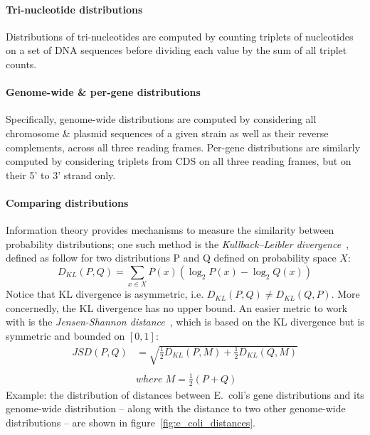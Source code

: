 \documentclass[12pt]{article}
\begin{document}
\paragraph{Tri-nucleotide distributions}
Distributions of tri-nucleotides are computed by counting triplets of nucleotides on a set of DNA sequences before dividing each value by the sum of all triplet counts.

\paragraph{Genome-wide \& per-gene distributions}
Specifically, genome-wide distributions are computed by considering all chromosome \& plasmid sequences of a given strain as well as their reverse complements, across all three reading frames. Per-gene distributions are similarly computed by considering triplets from CDS on all three reading frames, but on their 5' to 3' strand only.

\paragraph{Comparing distributions}
Information theory provides mechanisms to measure the similarity between probability distributions; one such method is the \textit{Kullback–Leibler divergence}~\cite{kullback1951information}, defined as follow for two distributions P and Q defined on probability space $X$:
%
\begin{equation}
D_{KL}(P, Q) = \sum\limits_{x \in X} P(x) (\log_2 P(x) - \log_2 Q(x))
\end{equation}
%
Notice that KL divergence is asymmetric, i.e. $D_{KL}(P, Q) \neq D_{KL}(Q, P)$. More concernedly, the KL divergence has no upper bound. An easier metric to work with is the \textit{Jensen-Shannon distance}~\cite{fuglede2004jensen}, which is based on the KL divergence but is symmetric and bounded on $[0, 1]$:
%
\begin{equation}
\begin{split}
JSD(P, Q) &= \sqrt{\frac{1}{2}D_{KL}(P, M) + \frac{1}{2}D_{KL}(Q, M)} \\
\\
& where \; M = \frac{1}{2}(P + Q)
\end{split}
\end{equation}
%
Example: the distribution of distances between E.~coli's gene distributions and its genome-wide distribution -- along with the distance to two other genome-wide distributions -- are shown in figure~\ref{fig:e_coli_distances}.
\end{document}
